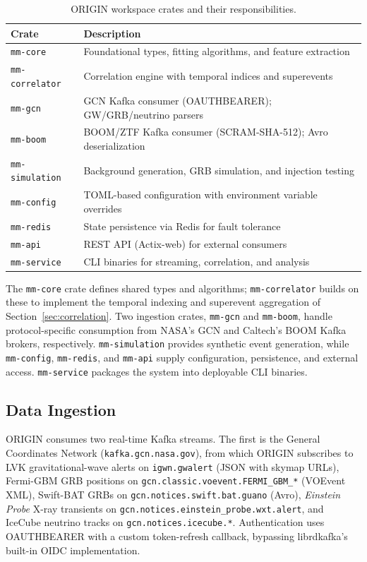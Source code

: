 \documentclass[twocolumn]{article}
\begin{document}
\begin{table}[htbp]
\centering
\caption{ORIGIN workspace crates and their responsibilities. \label{tab:crates}}
\begin{tabular}{ll}
\toprule
Crate & Description \\
\midrule
\texttt{mm-core}       & Foundational types, fitting algorithms, and feature extraction \\
\texttt{mm-correlator} & Correlation engine with temporal indices and superevents \\
\texttt{mm-gcn}        & GCN Kafka consumer (OAUTHBEARER); GW/GRB/neutrino parsers \\
\texttt{mm-boom}       & BOOM/ZTF Kafka consumer (SCRAM-SHA-512); Avro deserialization \\
\texttt{mm-simulation} & Background generation, GRB simulation, and injection testing \\
\texttt{mm-config}     & TOML-based configuration with environment variable overrides \\
\texttt{mm-redis}      & State persistence via Redis for fault tolerance \\
\texttt{mm-api}        & REST API (Actix-web) for external consumers \\
\texttt{mm-service}    & CLI binaries for streaming, correlation, and analysis \\
\bottomrule
\end{tabular}
\end{table}

The \texttt{mm-core} crate defines shared types and algorithms; \texttt{mm-correlator} builds on these to implement the temporal indexing and superevent aggregation of Section~\ref{sec:correlation}. Two ingestion crates, \texttt{mm-gcn} and \texttt{mm-boom}, handle protocol-specific consumption from NASA's GCN and Caltech's BOOM Kafka brokers, respectively. \texttt{mm-simulation} provides synthetic event generation, while \texttt{mm-config}, \texttt{mm-redis}, and \texttt{mm-api} supply configuration, persistence, and external access. \texttt{mm-service} packages the system into deployable CLI binaries.

\subsection{Data Ingestion} \label{sec:ingestion}

ORIGIN consumes two real-time Kafka streams. The first is the General Coordinates Network (\texttt{kafka.gcn.nasa.gov}), from which ORIGIN subscribes to LVK gravitational-wave alerts \citep{Chaudhary2024, LVK2019lowlatency} on \texttt{igwn.gwalert} (JSON with skymap URLs), Fermi-GBM GRB positions on \texttt{gcn.classic.voevent.FERMI\_GBM\_*} (VOEvent XML), Swift-BAT GRBs on \texttt{gcn.notices.swift.bat.guano} (Avro), \textit{Einstein Probe} \citep{EinsteinProbe2025} X-ray transients on \texttt{gcn.notices.einstein\_probe.wxt.alert}, and IceCube neutrino tracks on \texttt{gcn.notices.icecube.*}. Authentication uses OAUTHBEARER with a custom token-refresh callback, bypassing librdkafka's built-in OIDC implementation.
\end{document}
